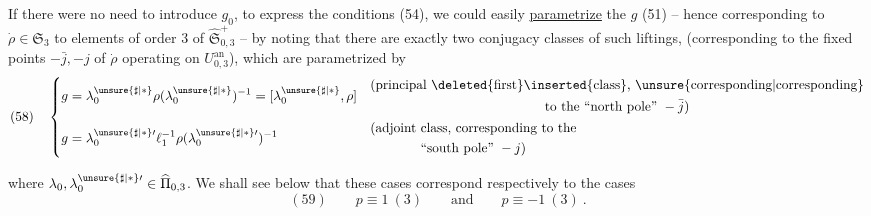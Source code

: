 If there were no need to introduce $g_0$, to express the conditions (54), we could easily \uline{parametrize} the $g$  (51) -- hence corresponding to  $\dot\rho\in\mathfrak S_3$ to elements of order $3$ of $\widehat{\mathfrak S}_{0,3}^{+}$ -- by noting that there are exactly two conjugacy classes of such liftings, (corresponding to the fixed points $-\bar j,-j$ of $\dot\rho$ operating on $U_{0,3}^{\mathrm{an}}$), which are parametrized by
\[
(58)\quad
\left\{\begin{aligned}
g&=\lambda_0^{\unsure{\sharp|\ast}}\rho(\lambda_0^{\unsure{\sharp|\ast}})^{-1}
=[\lambda_0^{\unsure{\sharp|\ast}},\rho]
&&\begin{gathered}\text{(principal \deleted{first}\inserted{class}, \unsure{corresponding|corresponding}}\\
\text{to the ``north pole'' }-\bar j)\end{gathered}\\
g&=\lambda_0^{\unsure{\sharp|\ast}\prime}\ell_1^{-1}\rho(\lambda_0^{\unsure{\sharp|\ast}\prime})^{-1}
&&\begin{gathered}\text{(adjoint class, corresponding to the}\\
\text{``south pole'' }-j)\end{gathered}
\end{aligned}\right.
\]


where $\lambda_0,\lambda_0^{\unsure{\sharp|\ast}\prime}\in\widehat{\Pi}_{0,3}$. We shall see below that these cases correspond respectively to the cases
\[
(59)\qquad p\equiv1\ (3)\qquad\text{and}\qquad p\equiv-1\ (3)\ .
\]
